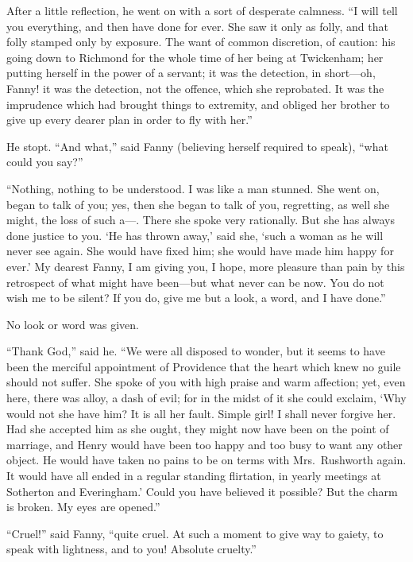 After a little reflection, he went on with a sort
of desperate calmness.  ``I will tell you everything,
and then have done for ever.  She saw it only as folly,
and that folly stamped only by exposure.  The want of
common discretion, of caution:  his going down to Richmond
for the whole time of her being at Twickenham; her putting
herself in the power of a servant; it was the detection,
in short---oh, Fanny! it was the detection, not the offence,
which she reprobated.  It was the imprudence which had
brought things to extremity, and obliged her brother
to give up every dearer plan in order to fly with her.''

He stopt.  ``And what,'' said Fanny (believing herself
required to speak), ``what could you say?''

``Nothing, nothing to be understood.  I was like a man stunned.
She went on, began to talk of you; yes, then she began
to talk of you, regretting, as well she might, the loss
of such a---.  There she spoke very rationally.  But she
has always done justice to you.  `He has thrown away,'
said she, `such a woman as he will never see again.
She would have fixed him; she would have made him happy
for ever.'  My dearest Fanny, I am giving you, I hope,
more pleasure than pain by this retrospect of what might
have been---but what never can be now.  You do not wish me
to be silent?  If you do, give me but a look, a word, and I
have done.''

No look or word was given.

``Thank God,'' said he.  ``We were all disposed to wonder,
but it seems to have been the merciful appointment
of Providence that the heart which knew no guile
should not suffer.  She spoke of you with high praise
and warm affection; yet, even here, there was alloy,
a dash of evil; for in the midst of it she could exclaim,
`Why would not she have him?  It is all her fault.
Simple girl!  I shall never forgive her.  Had she accepted
him as she ought, they might now have been on the point
of marriage, and Henry would have been too happy and too
busy to want any other object.  He would have taken
no pains to be on terms with Mrs.\ Rushworth again.
It would have all ended in a regular standing flirtation,
in yearly meetings at Sotherton and Everingham.'  Could you
have believed it possible?  But the charm is broken.
My eyes are opened.''

``Cruel!'' said Fanny, ``quite cruel.  At such a moment to
give way to gaiety, to speak with lightness, and to you!
Absolute cruelty.''

